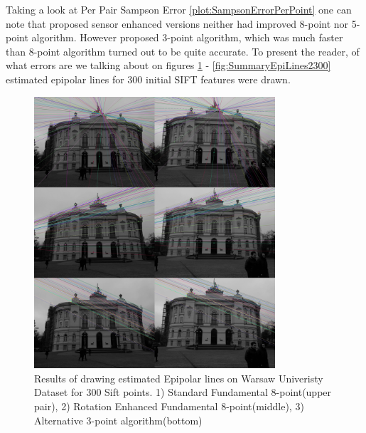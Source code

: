 Taking a look at Per Pair Sampson Error \ref{plot:SampsonErrorPerPoint} one can note that proposed sensor enhanced versions neither had improved 8-point nor 5-point algorithm. However proposed 3-point algorithm, which was much faster than 8-point algorithm turned out to be quite accurate. To present the reader, of what errors are we talking about on figures \ref{fig:SummaryEpiLines1300} - \ref{fig:SummaryEpiLines2300} estimated epipolar lines for 300 initial SIFT features were drawn. 
\begin{figure}[b!]
    \centering
    \includegraphics[width=0.8\textwidth]{summary1Sift300}
    \caption{Results of drawing estimated Epipolar lines on Warsaw Univeristy Dataset for 300 Sift points. 1) Standard Fundamental 8-point(upper pair), 2) Rotation Enhanced Fundamental 8-point(middle), 3) Alternative 3-point algorithm(bottom) }
    \label{fig:SummaryEpiLines1300}
\end{figure}
